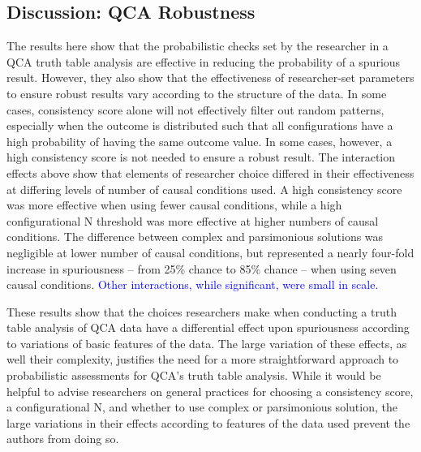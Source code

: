 \documentclass[12pt]{article}
\begin{document}
{{{{%

\subsection{Discussion: QCA Robustness}

The results here show that the probabilistic checks set by the researcher in a QCA truth table analysis are effective in reducing the probability of a spurious result. However, they also show that the effectiveness of researcher-set parameters to ensure robust results vary according to the structure of the data. In some cases, consistency score alone will not effectively filter out random patterns, especially when the outcome is distributed such that all configurations have a high probability of having the same outcome value. In some cases, however, a high consistency score is not needed to ensure a robust result. The interaction effects above show that elements of researcher choice differed in their effectiveness at differing levels of number of causal conditions used. A high consistency score was more effective when using fewer causal conditions, while a high configurational N threshold was more effective at higher numbers of causal conditions. The difference between complex and parsimonious solutions was negligible at lower number of causal conditions, but represented a nearly four-fold increase in spuriousness -- from 25\% chance to 85\% chance -- when using seven causal conditions. \textcolor{blue}{Other interactions, while significant, were small in scale.} 

These results show that the choices researchers make when conducting a truth table analysis of QCA data have a differential effect upon spuriousness according to variations of basic features of the data. The large variation of these effects, as well their complexity, justifies the need for a more straightforward approach to probabilistic assessments for QCA's truth table analysis. While it would be helpful to advise researchers on general practices for choosing a consistency score, a configurational N, and whether to use complex or parsimonious solution, the large variations in their effects according to features of the data used prevent the authors from doing so. 


\newpage

}}}}
\end{document}
